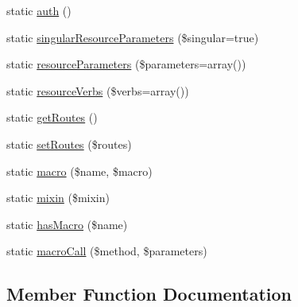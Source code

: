 \begin{DoxyCompactItemize}
\item 
static \mbox{\hyperlink{class_illuminate_1_1_support_1_1_facades_1_1_route_ad277eb6383efcee9dcd3ea564b39ad0f}{auth}} ()
\item 
static \mbox{\hyperlink{class_illuminate_1_1_support_1_1_facades_1_1_route_a109da236bab9351cc8a449917b32abb7}{singular\+Resource\+Parameters}} (\$singular=true)
\item 
static \mbox{\hyperlink{class_illuminate_1_1_support_1_1_facades_1_1_route_a99d41dab6379da413243e2b22c4cb336}{resource\+Parameters}} (\$parameters=array())
\item 
static \mbox{\hyperlink{class_illuminate_1_1_support_1_1_facades_1_1_route_a7e9d53bbab3ce3e9711d0eeb9643dc32}{resource\+Verbs}} (\$verbs=array())
\item 
static \mbox{\hyperlink{class_illuminate_1_1_support_1_1_facades_1_1_route_a8d907c259d15756737cb208e4acbd8a7}{get\+Routes}} ()
\item 
static \mbox{\hyperlink{class_illuminate_1_1_support_1_1_facades_1_1_route_a1622d20eba5c59f93b6d28a021439769}{set\+Routes}} (\$routes)
\item 
static \mbox{\hyperlink{class_illuminate_1_1_support_1_1_facades_1_1_route_aac6eba2155e061b8cff3a6c073ba9b86}{macro}} (\$name, \$macro)
\item 
static \mbox{\hyperlink{class_illuminate_1_1_support_1_1_facades_1_1_route_a2c2a3b5d21f7154bf5f028fc578cb834}{mixin}} (\$mixin)
\item 
static \mbox{\hyperlink{class_illuminate_1_1_support_1_1_facades_1_1_route_a57b330e021063745532d1790f82f60fc}{has\+Macro}} (\$name)
\item 
static \mbox{\hyperlink{class_illuminate_1_1_support_1_1_facades_1_1_route_a5d946c1e8f872ba226464d40ffb1bdb9}{macro\+Call}} (\$method, \$parameters)
\end{DoxyCompactItemize}


\subsection{Member Function Documentation}
\mbox{\label{class_illuminate_1_1_support_1_1_facades_1_1_route_a2303469c734df3248247dc66ec3e6b4f}} 
